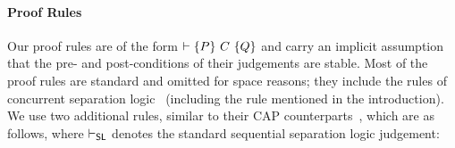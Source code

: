 \paragraph{\textbf{Proof Rules}}
Our proof rules are of the form $\entails \{P\}\ C\ \{Q\}$ and carry
an implicit assumption that the pre- and post-conditions of their
judgements are stable. Most of the proof rules are standard and
omitted for space reasons; they include the rules of concurrent
separation logic~\cite{csl-tcs} (including the 
rule mentioned in the introduction). We use two additional rules,
similar to their CAP counterparts~\cite{cap-ecoop10}, which are as
follows, where $\entails_{\textsf{SL}}$ denotes the standard
sequential separation logic judgement:
\begin{mathpar}

\end{mathpar}


